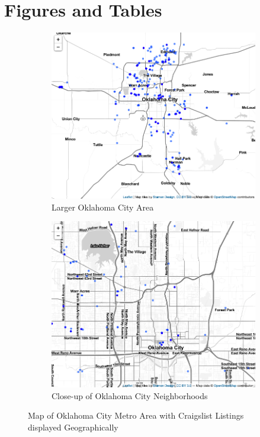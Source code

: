 \documentclass[12pt,english]{article}
\begin{document}
\section*{Figures and Tables}\label{sec:figTables}
\begin{figure} [ht]
\centering
\begin{subfigure}{.5\textwidth}
  \centering
  \includegraphics[width=.8\linewidth]{craigslist.mapfar.png}
  \caption{Larger Oklahoma City Area}
  \label{fig:sub1}
\end{subfigure}%
\begin{subfigure}{.5\textwidth}
  \centering
  \includegraphics[width=.8\linewidth]{craigslist.mapclose.png}
  \caption{Close-up of Oklahoma City Neighborhoods}
  \label{fig:sub2}
\end{subfigure}
\caption{Map of Oklahoma City Metro Area with Craigslist Listings displayed Geographically}
\label{fig:fig1}
\end{figure}
\end{document}
